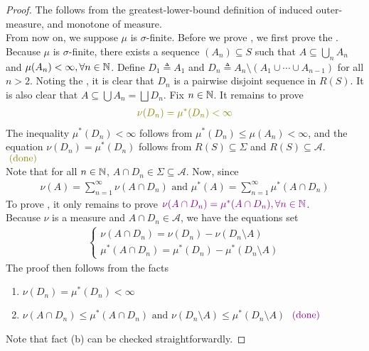 \documentclass{report}
\begin{document}
\begin{proof}
The  follows from the greatest-lower-bound definition of induced outer-measure,   and monotone of measure.\\

From now on, we suppose $\mu$ is $\sigma$-finite. Before we prove , we first prove the .\\

Because $\mu$ is $\sigma$-finite, there exists a sequence $(A_n)\subseteq S$ such that $A\subseteq \bigcup_n A_n$ and $\mu (A_n)<\infty,\forall n\in\mathbb{N}$. Define $D_1\triangleq A_1$ and  $D_n\triangleq A_n \setminus (A_1 \cup  \cdots \cup A_{n-1})$ for all  $n>2$. Noting the
, it is clear that $D_n$ is a pairwise disjoint sequence  in $R(S)$. It is also clear that $A\subseteq \bigcup A_n = \bigsqcup  D_n$. Fix $n\in\mathbb{N}$. It remains to prove 
\begin{align*}
\olive{\nu  (D_n)=\mu^*(D_n)<\infty}
\end{align*}
The inequality $\mu^*(D_n)<\infty$ follows from $\mu^*(D_n)\leq \mu (A_n)<\infty$, and the equation $\nu (D_n)=\mu^*(D_n)$ follows from $R(S)\subseteq \Sigma$ and $R(S)\subseteq \mathcal{A}$. $\odone$\\  

Note that for all $n\in\mathbb{N}$, $A\cap D_n \in \Sigma \subseteq \mathcal{A}$. Now, since 
\begin{align*}
\nu  (A)=\sum_{n=1}^{\infty} \nu (A\cap D_n)\text{ and }\mu^*(A)=\sum_{n=1}^{\infty} \mu^*(A\cap D_n)
\end{align*}
To prove , it only remains to prove $\textcolor{violet}{\nu  (A\cap D_n)=\mu^*(A\cap D_n),\forall n\in\mathbb{N}}$.\\

Because $\nu $ is a measure and $A\cap D_n \in \mathcal{A}$, we have the equations set 
\begin{align}
\begin{cases}
  \nu  (A\cap D_n)=\nu  (D_n)-\nu  (D_n\setminus A)\\  
\mu^*(A\cap D_n)=\mu^*(D_n)-\mu^*(D_n\setminus A)
\end{cases}
\end{align}
The proof then follows from the facts 
\begin{enumerate}[label=(\alph*)]
  \item $\nu (D_n)=\mu^*(D_n)<\infty$ 
  \item $\nu  (A\cap D_n)\leq \mu^*(A\cap D_n)\text{ and }\nu (D_n\setminus A)\leq \mu^*(D_n\setminus A)$ $\textcolor{violet}{\text{ (done) }}$
\end{enumerate}
Note that fact (b) can be checked straightforwardly. 
\end{proof}
\end{document}
